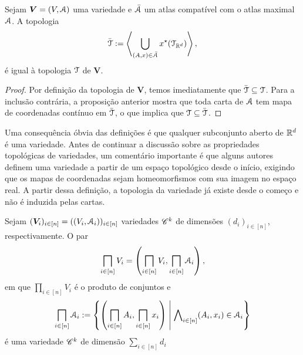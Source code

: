 \begin{proposition}
Sejam $\bm V=(V,\mathcal{A})$ uma variedade e $\bar{\mathcal{A}}$ um atlas compatível com o atlas maximal $\mathcal{A}$. A topologia
	\begin{equation*}
	\bar{\mathcal{T}} := \left\langle \bigcup_{(A,x) \in \bar{\mathcal{A}}} x^\star(\mathcal{T}_{\mathbb{R}^d}) \right\rangle,
	\end{equation*}
é igual à topologia $\mathcal{T}$ de $\bm V$.
\end{proposition}
\begin{proof}
Por definição da topologia de $\bm V$, temos imediatamente que $\bar{\mathcal{T}} \subseteq \mathcal{T}$. Para a inclusão contrária, a proposição anterior mostra que toda carta de $\mathcal{A}$ tem mapa de coordenadas contínuo em $\bar{\mathcal{T}}$, o que implica que $\mathcal{T} \subseteq \bar{\mathcal{T}}$.
\end{proof}

Uma consequência óbvia das definições é que qualquer subconjunto aberto de $\mathbb{R}^d$ é uma variedade. Antes de continuar a discussão sobre as propriedades topológicas de variedades, um comentário importante é que alguns autores definem uma variedade a partir de um espaço topológico desde o início, exigindo que os mapas de coordenadas sejam homeomorfismos com sua imagem no espaço real. A partir dessa definição, a topologia da variedade já existe desde o começo e não é induzida pelas cartas.

\begin{exercise}
Sejam $(\bm V_i)_{i \in [n]} = ((V_i,\mathcal{A}_i))_{i \in [n]}$ variedades $\mathscr{C}^k$ de dimensões $(d_i)_{i \in [n]}$, respectivamente. O par
	\begin{equation*}
	\prod_{i \in [n]} V_i = \left( \prod_{i \in [n]} V_i, \prod_{i \in [n]} \atlas_i \right),
	\end{equation*}
em que $\prod_{i \in [n]} V_i$ é o produto de conjuntos e
	\begin{equation*}
	\prod_{i \in [n]} \atlas_i := \set{ \left(\prod_{i \in [n]} A_i, \prod_{i \in [n]} \x_i \right)}{\forall_{i \in [n]} (A_i,\x_i) \in \atlas_i}
	\end{equation*}
é uma variedade $\mathscr{C}^k$ de dimensão $\sum_{i \in [n]} d_i$
\end{exercise}

